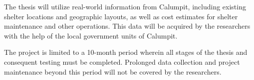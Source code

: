	The thesis will utilize real-world information from Calumpit, including existing shelter locations and geographic layouts, as well as cost estimates for shelter maintenance and other operations. This data will be acquired by the researchers with the help of the local government units of Calumpit.
	
	The project is limited to a 10-month period wherein all stages of the thesis and consequent testing must be completed. Prolonged data collection and project maintenance beyond this period will not be covered by the researchers.
